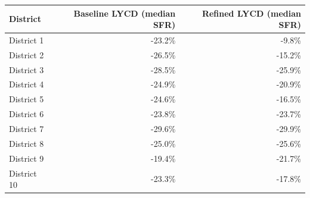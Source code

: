 \begin{tabularx}{\linewidth}{@{} Xrr @{}}
\toprule
District & Baseline LYCD (median SFR) & Refined LYCD (median SFR) \\
\midrule
District 1 & -23.2\% & -9.8\% \\
District 2 & -26.5\% & -15.2\% \\
District 3 & -28.5\% & -25.9\% \\
District 4 & -24.9\% & -20.9\% \\
District 5 & -24.6\% & -16.5\% \\
District 6 & -23.8\% & -23.7\% \\
District 7 & -29.6\% & -29.9\% \\
District 8 & -25.0\% & -25.6\% \\
District 9 & -19.4\% & -21.7\% \\
District 10 & -23.3\% & -17.8\% \\
\bottomrule
\end{tabularx}
